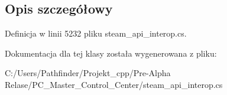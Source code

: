\subsection{Opis szczegółowy}


Definicja w linii 5232 pliku steam\+\_\+api\+\_\+interop.\+cs.



Dokumentacja dla tej klasy została wygenerowana z pliku\+:\begin{DoxyCompactItemize}
\item 
C\+:/\+Users/\+Pathfinder/\+Projekt\+\_\+cpp/\+Pre-\/\+Alpha Relase/\+P\+C\+\_\+\+Master\+\_\+\+Control\+\_\+\+Center/steam\+\_\+api\+\_\+interop.\+cs\end{DoxyCompactItemize}
